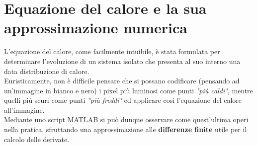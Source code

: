 \section{Equazione del calore e la sua approssimazione numerica}
L'equazione del calore, come facilmente intuibile, è stata formulata per determinare l'evoluzione di un sistema isolato che presenta al suo interno una data distribuzione di calore.\\
Euristicamente, non è difficile pensare che si possano codificare (pensando ad un'immagine in bianco e nero) i pixel più luminosi come punti \textit{"più caldi"}, mentre quelli più scuri come punti \textit{"più freddi"} ed applicare così l'equazione del calore all'immagine.\\
Mediante uno script MATLAB si può dunque osservare come quest'ultima operi nella pratica, sfruttando una approssimazione alle \textbf{differenze finite } utile per il calcolo delle derivate.\\
